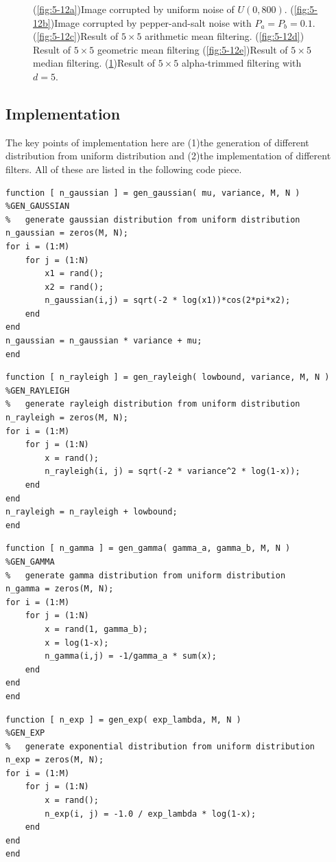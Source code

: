 \begin{figure}[h]
\begin{subfigure}[b]{0.4\linewidth}
		\caption{}
		\label{fig:5-12f}
	\end{subfigure}
  	\caption{(\ref{fig:5-12a})Image corrupted by uniform noise of $U(0,800)$. (\ref{fig:5-12b})Image corrupted by pepper-and-salt noise with $P_a=P_b=0.1$. (\ref{fig:5-12c})Result of $5\times5$ arithmetic mean filtering. (\ref{fig:5-12d}) Result of $5\times5$ geometric mean filtering  (\ref{fig:5-12e})Result of $5\times5$ median filtering. (\ref{fig:5-12f})Result of $5\times5$ alpha-trimmed filtering with $d=5$.}
  	\label{fig:5-12}
\end{figure}

\clearpage
\subsection{Implementation}
The key points of implementation here are (1)the generation of different distribution from uniform distribution and (2)the implementation of different filters. All of these are listed in the following code piece.

\lstset{language=Matlab}
\begin{lstlisting}
function [ n_gaussian ] = gen_gaussian( mu, variance, M, N )
%GEN_GAUSSIAN 
%   generate gaussian distribution from uniform distribution
n_gaussian = zeros(M, N);
for i = (1:M)
    for j = (1:N)
        x1 = rand();
        x2 = rand();
        n_gaussian(i,j) = sqrt(-2 * log(x1))*cos(2*pi*x2);
    end
end
n_gaussian = n_gaussian * variance + mu;
end
\end{lstlisting}

\begin{lstlisting}
function [ n_rayleigh ] = gen_rayleigh( lowbound, variance, M, N )
%GEN_RAYLEIGH 
%   generate rayleigh distribution from uniform distribution
n_rayleigh = zeros(M, N);
for i = (1:M)
    for j = (1:N)
        x = rand();
        n_rayleigh(i, j) = sqrt(-2 * variance^2 * log(1-x));
    end
end
n_rayleigh = n_rayleigh + lowbound;
end
\end{lstlisting}

\begin{lstlisting}
function [ n_gamma ] = gen_gamma( gamma_a, gamma_b, M, N )
%GEN_GAMMA
%   generate gamma distribution from uniform distribution
n_gamma = zeros(M, N);
for i = (1:M)
    for j = (1:N)
        x = rand(1, gamma_b);
        x = log(1-x);
        n_gamma(i,j) = -1/gamma_a * sum(x);
    end
end
end
\end{lstlisting}

\begin{lstlisting}
function [ n_exp ] = gen_exp( exp_lambda, M, N )
%GEN_EXP 
%   generate exponential distribution from uniform distribution
n_exp = zeros(M, N);
for i = (1:M)
    for j = (1:N)
        x = rand();
        n_exp(i, j) = -1.0 / exp_lambda * log(1-x);
    end
end
end
\end{lstlisting}

